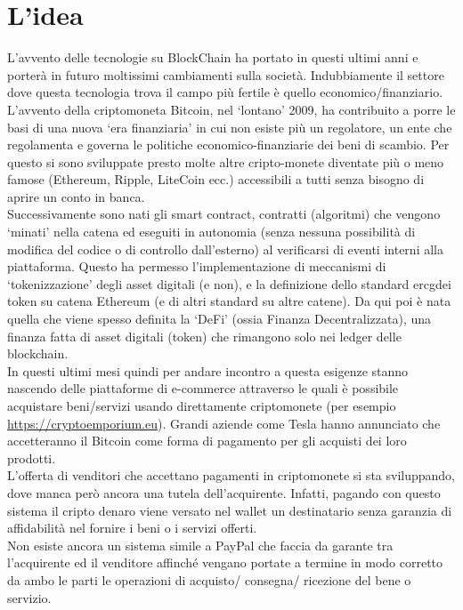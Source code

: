 \section{L'idea}
L’avvento delle tecnologie su BlockChain ha portato in questi ultimi anni e porterà in futuro moltissimi cambiamenti sulla società. Indubbiamente il settore dove questa tecnologia trova il campo più fertile è quello economico/finanziario. L’avvento della criptomoneta Bitcoin, nel ‘lontano’ 2009, ha contribuito a porre le basi di una nuova ‘era finanziaria’ in cui non esiste più un regolatore, un ente che regolamenta e governa le politiche economico-finanziarie dei beni di scambio. Per questo si sono sviluppate presto molte altre cripto-monete diventate più o meno famose (Ethereum, Ripple, LiteCoin ecc.) accessibili a tutti senza bisogno di aprire un conto in banca.\\
Successivamente sono nati gli smart contract, contratti (algoritmi) che vengono ‘minati’ nella catena ed eseguiti in autonomia (senza nessuna possibilità di modifica del codice o di controllo dall’esterno) al verificarsi di eventi interni alla piattaforma. Questo ha permesso l’implementazione di meccanismi di ‘tokenizzazione’ degli asset digitali (e non), e la definizione dello standard \gls{ercg}\glsfirstoccur  dei token su catena Ethereum (e di altri standard su altre catene). Da qui poi è nata quella che viene spesso definita la ‘DeFi’ (ossia Finanza Decentralizzata), una finanza fatta di asset digitali (token) che rimangono solo nei ledger delle blockchain.\\
In questi ultimi mesi quindi per andare incontro a questa esigenze stanno nascendo delle piattaforme di e-commerce attraverso le quali è possibile acquistare beni/servizi usando direttamente criptomonete (per esempio \href{https://cryptoemporium.eu}{https://cryptoemporium.eu}). Grandi aziende come Tesla hanno annunciato che accetteranno il Bitcoin come forma di pagamento per gli acquisti dei loro prodotti.\\
L’offerta di venditori che accettano pagamenti in criptomonete si sta sviluppando, dove  manca però ancora una tutela dell’acquirente. Infatti, pagando con questo sistema il cripto denaro viene versato nel wallet un destinatario senza garanzia di affidabilità nel fornire i beni o i servizi offerti.\\
Non esiste ancora un sistema simile a PayPal che faccia da garante tra l’acquirente ed il venditore affinché vengano portate a termine in modo corretto da ambo le parti le operazioni di acquisto/ consegna/ ricezione del bene o servizio.\\
